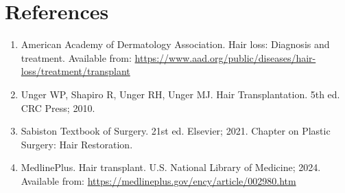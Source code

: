 \section*{References}
\begin{enumerate}
  \item American Academy of Dermatology Association. Hair loss: Diagnosis and treatment. Available from: \url{https://www.aad.org/public/diseases/hair-loss/treatment/transplant}
  \item Unger WP, Shapiro R, Unger RH, Unger MJ. Hair Transplantation. 5th ed. CRC Press; 2010.
  \item Sabiston Textbook of Surgery. 21st ed. Elsevier; 2021. Chapter on Plastic Surgery: Hair Restoration.
  \item MedlinePlus. Hair transplant. U.S. National Library of Medicine; 2024. Available from: \url{https://medlineplus.gov/ency/article/002980.htm}
\end{enumerate}

\clearpage
